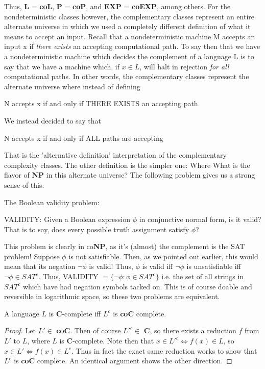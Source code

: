 Thus, \textbf{L} = \textbf{coL}, \textbf{P} = \textbf{coP}, and \textbf{EXP} = \textbf{coEXP}, among others. For the nondeterministic classes however, the complementary classes represent an entire alternate universe in which we used a completely different definition of what it means to accept an input. Recall that a nondeterministic machine M accepts an input x if \textit{there exists} an accepting computational path. To say then that we have a nondeterministic machine which decides the complement of a language L is to say that we have a machine which, if $x \in L$, will halt in rejection \textit{for all} computational paths. In other words, the complementary classes represent the alternate universe where instead of defining
\begin{center}
    N accepts x if and only if THERE EXISTS an accepting path
\end{center}
We instead decided to say that
\begin{center}
    N accepts x if and only if ALL paths are accepting
\end{center}
That is the 'alternative definition' interpretation of the complementary complexity classes. The other definition is the simpler one: Where 
What is the flavor of \textbf{NP} in this alternate universe? The following problem gives us a strong sense of this:
\begin{problem} The Boolean validity problem:
\begin{center}
    VALIDITY: Given a Boolean expression $\phi$ in conjunctive normal form, is it valid? That is to say, does every possible truth assignment satisfy $\phi$?
\end{center}
\end{problem}
This problem is clearly in co\textbf{NP}, as it's (almost) the complement is the SAT problem! Suppose $\phi$ is not satisfiable. Then, as we pointed out earlier, this would mean that its negation $\neg \phi$ is valid! Thus, $\phi$ is valid iff $\neg \phi$ is unsatisfiable iff $\neg \phi \in SAT^c$. Thus, VALIDITY $=\{\neg \phi: \phi \in SAT^c\}$ i.e. the set of all strings in $SAT^c$ which have had negation symbols tacked on. This is of course doable and reversible in logarithmic space, so these two problems are equivalent.
\begin{fact}
    A language $L$ is \textbf{C}-complete iff $L^c$ is \textbf{coC} complete.
\end{fact}
\begin{proof}
    Let $L' \in$ \textbf{coC}. Then of course $L'^c \in$ \textbf{C}, so there exists a reduction $f$ from $L'$ to $L$, where $L$ is \textbf{C}-complete. Note then that $x \in L'^c \iff f(x) \in L$, so $x \in L' \iff f(x) \in L^c$. Thus in fact the exact same reduction works to show that $L^c$ is \textbf{coC} complete. An identical argument shows the other direction.
\end{proof}
